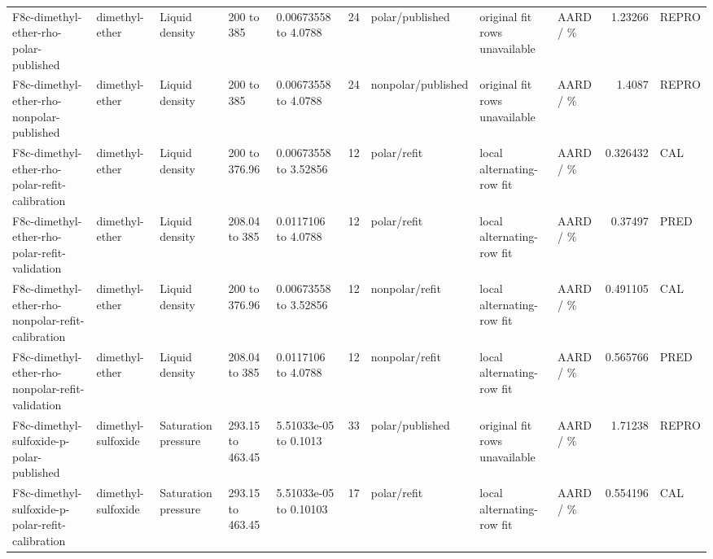 \begin{landscape}
\begin{longtable}{L{1.9cm}L{2.5cm}L{2.1cm}L{1.6cm}L{1.6cm}rL{2.4cm}L{1.9cm}L{2.2cm}rL{1cm}}
F8c-\allowbreak{}dimethyl-\allowbreak{}ether-\allowbreak{}rho-\allowbreak{}polar-\allowbreak{}published & dimethyl-\allowbreak{}ether & Liquid density & 200 to 385 & 0.00673558 to 4.0788 & 24 & polar/\allowbreak{}published & original fit rows unavailable & AARD /\allowbreak{} \% & 1.23266 & REPRO \\
F8c-\allowbreak{}dimethyl-\allowbreak{}ether-\allowbreak{}rho-\allowbreak{}nonpolar-\allowbreak{}published & dimethyl-\allowbreak{}ether & Liquid density & 200 to 385 & 0.00673558 to 4.0788 & 24 & nonpolar/\allowbreak{}published & original fit rows unavailable & AARD /\allowbreak{} \% & 1.4087 & REPRO \\
F8c-\allowbreak{}dimethyl-\allowbreak{}ether-\allowbreak{}rho-\allowbreak{}polar-\allowbreak{}refit-\allowbreak{}calibration & dimethyl-\allowbreak{}ether & Liquid density & 200 to 376.96 & 0.00673558 to 3.52856 & 12 & polar/\allowbreak{}refit & local alternating-\allowbreak{}row fit & AARD /\allowbreak{} \% & 0.326432 & CAL \\
F8c-\allowbreak{}dimethyl-\allowbreak{}ether-\allowbreak{}rho-\allowbreak{}polar-\allowbreak{}refit-\allowbreak{}validation & dimethyl-\allowbreak{}ether & Liquid density & 208.04 to 385 & 0.0117106 to 4.0788 & 12 & polar/\allowbreak{}refit & local alternating-\allowbreak{}row fit & AARD /\allowbreak{} \% & 0.37497 & PRED \\
F8c-\allowbreak{}dimethyl-\allowbreak{}ether-\allowbreak{}rho-\allowbreak{}nonpolar-\allowbreak{}refit-\allowbreak{}calibration & dimethyl-\allowbreak{}ether & Liquid density & 200 to 376.96 & 0.00673558 to 3.52856 & 12 & nonpolar/\allowbreak{}refit & local alternating-\allowbreak{}row fit & AARD /\allowbreak{} \% & 0.491105 & CAL \\
F8c-\allowbreak{}dimethyl-\allowbreak{}ether-\allowbreak{}rho-\allowbreak{}nonpolar-\allowbreak{}refit-\allowbreak{}validation & dimethyl-\allowbreak{}ether & Liquid density & 208.04 to 385 & 0.0117106 to 4.0788 & 12 & nonpolar/\allowbreak{}refit & local alternating-\allowbreak{}row fit & AARD /\allowbreak{} \% & 0.565766 & PRED \\
F8c-\allowbreak{}dimethyl-\allowbreak{}sulfoxide-\allowbreak{}p-\allowbreak{}polar-\allowbreak{}published & dimethyl-\allowbreak{}sulfoxide & Saturation pressure & 293.15 to 463.45 & 5.51033e-\allowbreak{}05 to 0.1013 & 33 & polar/\allowbreak{}published & original fit rows unavailable & AARD /\allowbreak{} \% & 1.71238 & REPRO \\
F8c-\allowbreak{}dimethyl-\allowbreak{}sulfoxide-\allowbreak{}p-\allowbreak{}polar-\allowbreak{}refit-\allowbreak{}calibration & dimethyl-\allowbreak{}sulfoxide & Saturation pressure & 293.15 to 463.45 & 5.51033e-\allowbreak{}05 to 0.10103 & 17 & polar/\allowbreak{}refit & local alternating-\allowbreak{}row fit & AARD /\allowbreak{} \% & 0.554196 & CAL \\

\end{longtable}
\end{landscape}
